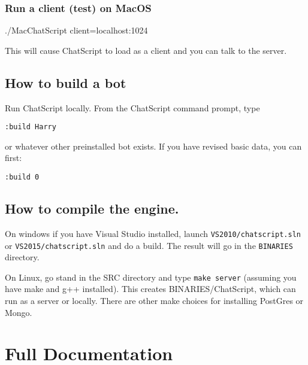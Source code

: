 \documentclass[]{article}
\newenvironment{Shaded}{}{}
\newcommand{\ExtensionTok}[1]{#1}
\newcommand{\NormalTok}[1]{#1}
\begin{document}
\subsubsection{Run a client (test) on
MacOS}\label{run-a-client-test-on-macos}

\begin{Shaded}
\begin{Highlighting}[]
\ExtensionTok{./MacChatScript}\NormalTok{ client=localhost:1024}
\end{Highlighting}
\end{Shaded}

This will cause ChatScript to load as a client and you can talk to the
server.

\subsection{How to build a bot}\label{how-to-build-a-bot}

Run ChatScript locally. From the ChatScript command prompt, type

\begin{verbatim}
:build Harry
\end{verbatim}

or whatever other preinstalled bot exists. If you have revised basic
data, you can first:

\begin{verbatim}
:build 0
\end{verbatim}

\subsection{How to compile the
engine.}\label{how-to-compile-the-engine.}

On windows if you have Visual Studio installed, launch
\texttt{VS2010/chatscript.sln} or \texttt{VS2015/chatscript.sln} and do
a build. The result will go in the \texttt{BINARIES} directory.

On Linux, go stand in the SRC directory and type \texttt{make\ server}
(assuming you have make and g++ installed). This creates
BINARIES/ChatScript, which can run as a server or locally. There are
other make choices for installing PostGres or Mongo.

\section{Full Documentation}\label{full-documentation}
\end{document}
